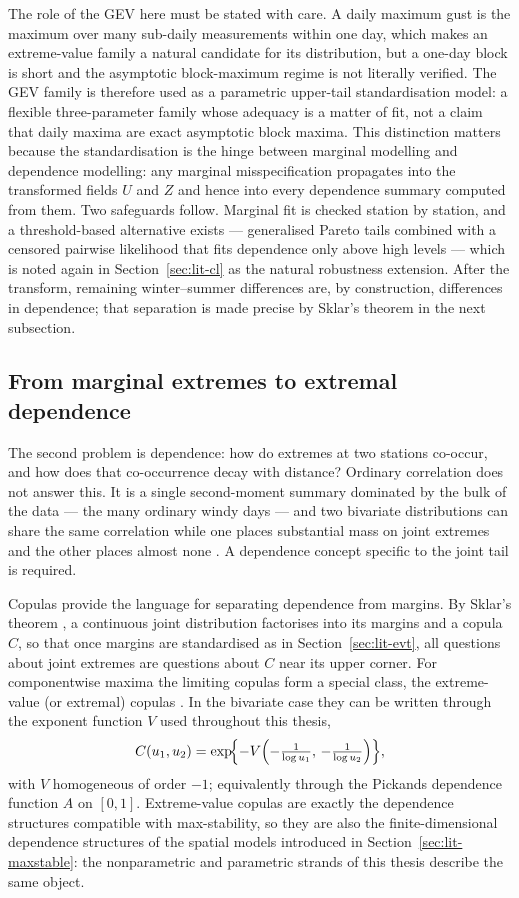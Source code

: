 The role of the GEV here must be stated with care. A daily maximum gust is the maximum over many sub-daily measurements within one day, which makes an extreme-value family a natural candidate for its distribution, but a one-day block is short and the asymptotic block-maximum regime is not literally verified. The GEV family is therefore used as a parametric upper-tail standardisation model: a flexible three-parameter family whose adequacy is a matter of fit, not a claim that daily maxima are exact asymptotic block maxima. This distinction matters because the standardisation is the hinge between marginal modelling and dependence modelling: any marginal misspecification propagates into the transformed fields \(U\) and \(Z\) and hence into every dependence summary computed from them. Two safeguards follow. Marginal fit is checked station by station, and a threshold-based alternative exists --- generalised Pareto tails combined with a censored pairwise likelihood that fits dependence only above high levels \citep{huser2013} --- which is noted again in Section~\ref{sec:lit-cl} as the natural robustness extension. After the transform, remaining winter--summer differences are, by construction, differences in dependence; that separation is made precise by Sklar's theorem in the next subsection.

\subsection{From marginal extremes to extremal dependence}\label{sec:lit-dependence}\label{sec:lit-diagnostics}

The second problem is dependence: how do extremes at two stations co-occur, and how does that co-occurrence decay with distance? Ordinary correlation does not answer this. It is a single second-moment summary dominated by the bulk of the data --- the many ordinary windy days --- and two bivariate distributions can share the same correlation while one places substantial mass on joint extremes and the other places almost none \citep{coles1999}. A dependence concept specific to the joint tail is required.

Copulas provide the language for separating dependence from margins. By Sklar's theorem \citep{sklar1959}, a continuous joint distribution factorises into its margins and a copula \(C\), so that once margins are standardised as in Section~\ref{sec:lit-evt}, all questions about joint extremes are questions about \(C\) near its upper corner. For componentwise maxima the limiting copulas form a special class, the extreme-value (or extremal) copulas \citep{dehaan2006,gudendorf2010}. In the bivariate case they can be written through the exponent function \(V\) used throughout this thesis,
\[
    C(u_1,u_2)=\exp\!\Bigl\{-V\Bigl(-\tfrac{1}{\log u_1},\,-\tfrac{1}{\log u_2}\Bigr)\Bigr\},
\]
with \(V\) homogeneous of order \(-1\); equivalently through the Pickands dependence function \(A\) on \([0,1]\). Extreme-value copulas are exactly the dependence structures compatible with max-stability, so they are also the finite-dimensional dependence structures of the spatial models introduced in Section~\ref{sec:lit-maxstable}: the nonparametric and parametric strands of this thesis describe the same object.


